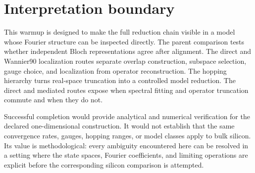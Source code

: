 \section*{Interpretation boundary}

This warmup is designed to make the full reduction chain visible in a model
whose Fourier structure can be inspected directly. The parent comparison tests
whether independent Bloch representations agree after alignment. The direct and Wannier90 localization routes separate overlap construction,
subspace selection, gauge choice, and localization from operator reconstruction.
The hopping hierarchy turns real-space truncation into a controlled model
reduction. The direct and mediated routes expose when spectral fitting and
operator truncation commute and when they do not.

Successful completion would provide analytical and numerical verification for
the declared one-dimensional construction. It would not establish that the
same convergence rates, gauges, hopping ranges, or model classes apply to
bulk silicon. Its value is methodological: every ambiguity encountered here can
be resolved in a setting where the state spaces, Fourier coefficients, and
limiting operations are explicit before the corresponding silicon comparison
is attempted.
